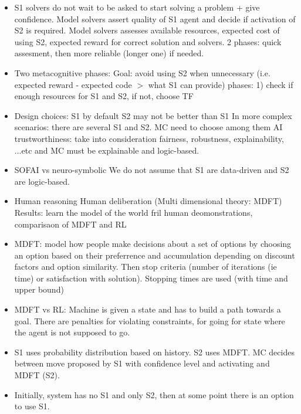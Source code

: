 \documentclass{article}
\begin{document}
\begin{itemize}
  \item S1 solvers do not wait to be asked to start solving a problem + give confidence. Model solvers assert quality of S1 agent and decide if activation of S2 is required. Model solvers assesses available resources, expected cost of using S2, expected reward for correct solution and solvers. 2 phases: quick assesment, then more reliable (longer one) if needed.
  \item Two metacognitive phases:
        \subitem Goal: avoid using S2 when unnecessary (i.e. expected reward - expected code $>$ what S1 can provide)
         phases: 1) check if enough resources for S1 and S2, if not, choose TF
  \item Design choices:
        \subitem S1 by default
        \subitem S2 may not be better than S1
        \subitem In more complex scenarios: there are several S1 and S2. MC need to choose among them
        \subitem AI trustworthiness: take into consideration fairness, robustness, explainability, ...etc and MC must be explainable and logic-based.
  \item SOFAI vs neuro-symbolic
        \subitem We do not assume that S1 are data-driven and S2 are logic-based.
  \item Human reasoning
        \subitem Human deliberation (Multi dimensional theory: MDFT)
        \subitem Results: learn the model of the world fril human deomonstrations, comparisaon of MDFT and RL
  \item MDFT: model how people make decisions about a set of options by choosing an option based on their preferrence and accumulation depending on discount factors and option similarity. Then stop criteria (number of iterations (ie time) or satisfaction with solution). Stopping times are used (with time and upper bound)
  \item MDFT vs RL: Machine is given a state and has to build a path towards a goal. There are penalties for violating constraints, for going for state where the agent is not supposed to go.
  \item S1 uses probability distribution based on history. S2 uses MDFT. MC decides between move proposed by S1 with confidence level and activating and MDFT (S2).
  \item Initially, system has no S1 and only S2, then at some point there is an option to use S1.
\end{itemize}
\end{document}
